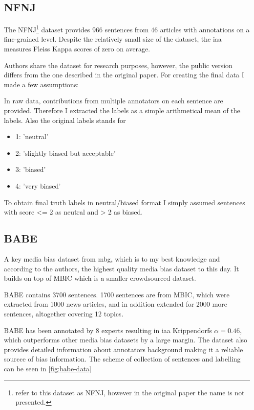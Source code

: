 \subsection{NFNJ}
The NFNJ\footnote{\cite{farber2020multidimensional} refer to this dataset as NFNJ, however in the original paper the name is not presented.} dataset provides 966 sentences from 46 articles with annotations on a fine-grained level. Despite the relatively small size of the dataset, the \Gls{iaa} measures Fleiss Kappa scores of zero on average.

Authors share the dataset for research purposes, however, the public version differs from the one described in the original paper. For creating the final data I made a few assumptions:

In raw data, contributions from multiple annotators on each sentence are provided. Therefore I extracted the labels as a simple arithmetical mean of the labels. Also the original labels stands for 
\begin{itemize}
    \item 1: 'neutral'
    \item 2: 'slightly biased but acceptable'
    \item 3: 'biased'
    \item 4: 'very biased'
\end{itemize}
To obtain final truth labels in neutral/biased format I simply assumed sentences with score <= 2 as neutral and > 2 as biased.




\subsection{BABE}
A key media bias dataset from \Gls{mbg}, which is to my best knowledge and according to the authors, the highest quality media bias dataset to this day. It builds on top of MBIC \cite{Spinde2021MBIC} which is a smaller crowdsourced dataset.

BABE contains 3700 sentences. 1700 sentences are from MBIC, which were extracted from 1000 news articles, and in addition extended for 2000 more sentences, altogether covering 12 topics.

BABE has been annotated by 8 experts resulting in \gls{iaa} Krippendorfs $\alpha = 0.46$, which outperforms other media bias datasets by a large margin. The dataset also provides detailed information about annotators background making it a reliable sourcce of bias information. The scheme of collection of sentences and labelling can be seen in \ref{fig:babe-data}

